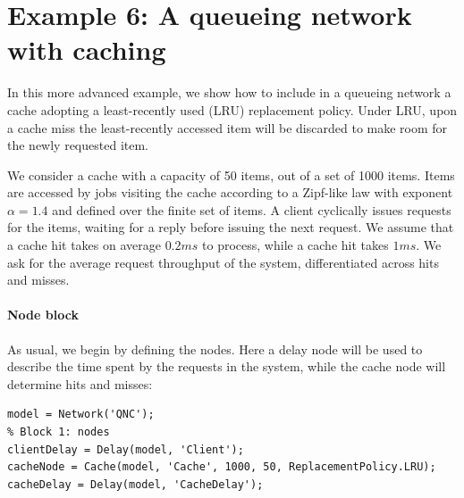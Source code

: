 \section{Example 6: A queueing network with caching}
\label{example-6-a-queueing-network-with-caching}
In this more advanced example, we show how to include in a queueing network a cache adopting a least-recently used (LRU) replacement policy. Under LRU, upon a cache miss the least-recently accessed item will be discarded to make room for the newly requested item.

We consider a cache with a capacity of 50 items, out of a set of 1000 items. Items are accessed by jobs visiting the cache according to a Zipf-like law with exponent $\alpha=1.4$ and defined over the finite set of items. A client cyclically issues requests for the items, waiting for a reply before issuing the next request. We assume that a cache hit takes on average $0.2ms$ to process, while a cache hit takes $1ms$. We ask for the average request throughput of the system, differentiated across hits and misses.

\paragraph{Node block}
As usual, we begin by defining the nodes. Here a delay node will be used to describe the time spent by the requests in the system, while the cache node will determine hits and misses:
\begin{lstlisting}
model = Network('QNC');
% Block 1: nodes
clientDelay = Delay(model, 'Client');
cacheNode = Cache(model, 'Cache', 1000, 50, ReplacementPolicy.LRU);
cacheDelay = Delay(model, 'CacheDelay');
\end{lstlisting}

